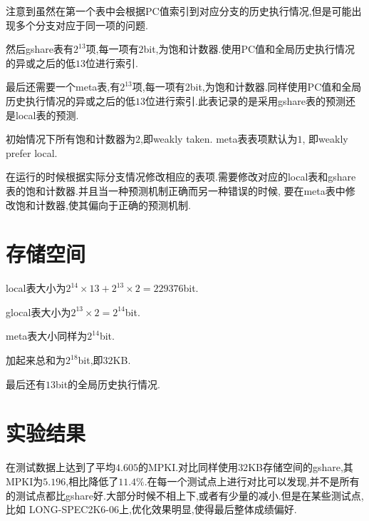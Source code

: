 \documentclass[adobefonts, nocap]{ctexart}
\begin{document}
    注意到虽然在第一个表中会根据PC值索引到对应分支的历史执行情况,但是可能出现多个分支对应于同一项的问题.

    然后gshare表有$2^{13}$项,每一项有$2$bit,为饱和计数器.使用PC值和全局历史执行情况的异或之后的低$13$位进行索引.

    最后还需要一个meta表,有$2^{13}$项,每一项有$2$bit,为饱和计数器.同样使用PC值和全局历史执行情况的异或之后的低$13$位进行索引.此表记录的是采用gshare表的预测还是local表的预测.

    初始情况下所有饱和计数器为$2$,即weakly taken. meta表表项默认为$1$, 即weakly prefer local.

    在运行的时候根据实际分支情况修改相应的表项.需要修改对应的local表和gshare表的饱和计数器.并且当一种预测机制正确而另一种错误的时候,
    要在meta表中修改饱和计数器,使其偏向于正确的预测机制.
  \section{存储空间}
    local表大小为$2^{14}\times 13+2^{13}\times 2=229376$bit.

    glocal表大小为$2^{13}\times 2=2^{14}$bit.

    meta表大小同样为$2^{14}$bit.

    加起来总和为$2^{18}$bit,即$32$KB.

    最后还有$13$bit的全局历史执行情况.
  \section{实验结果}
    在测试数据上达到了平均$4.605$的MPKI.对比同样使用$32$KB存储空间的gshare,其MPKI为$5.196$,相比降低了$11.4\%$.在每一个测试点上进行对比可以发现,并不是所有的测试点都比gshare好.大部分时候不相上下,或者有少量的减小.但是在某些测试点,比如
    LONG-SPEC2K6-06上,优化效果明显,使得最后整体成绩偏好.
\end{document}
